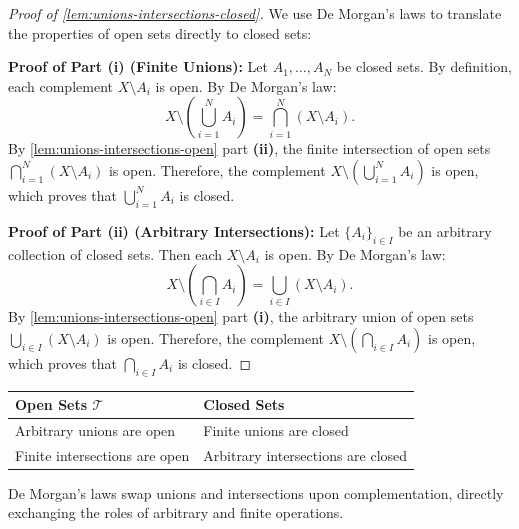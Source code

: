 \begin{content}
\begin{proof}[Proof of \cref{lem:unions-intersections-closed}]
We use De Morgan's laws to translate the properties of open sets directly to closed sets:

\textbf{Proof of Part (i) (Finite Unions):}
Let $A_1, \dots, A_N$ be closed sets. By definition, each complement $X \setminus A_i$ is open.
By De Morgan's law:
\begin{equation}\label{eq:demorgan-union}
X \setminus \left( \bigcup_{i=1}^N A_i \right) = \bigcap_{i=1}^N (X \setminus A_i).
\end{equation}
By \cref{lem:unions-intersections-open} part \textbf{(ii)}, the finite intersection of open sets $\bigcap_{i=1}^N (X \setminus A_i)$ is open.
Therefore, the complement $X \setminus \left( \bigcup_{i=1}^N A_i \right)$ is open, which proves that $\bigcup_{i=1}^N A_i$ is closed.

\textbf{Proof of Part (ii) (Arbitrary Intersections):}
Let $\{A_i\}_{i \in I}$ be an arbitrary collection of closed sets. Then each $X \setminus A_i$ is open.
By De Morgan's law:
\begin{equation}\label{eq:demorgan-intersection}
X \setminus \left( \bigcap_{i \in I} A_i \right) = \bigcup_{i \in I} (X \setminus A_i).
\end{equation}
By \cref{lem:unions-intersections-open} part \textbf{(i)}, the arbitrary union of open sets $\bigcup_{i \in I} (X \setminus A_i)$ is open.
Therefore, the complement $X \setminus \left( \bigcap_{i \in I} A_i \right)$ is open, which proves that $\bigcap_{i \in I} A_i$ is closed.
\end{proof}

\begin{steps}
\begin{center}
\begin{tabular}{l l}
    \textbf{Open Sets $\mathcal{T}$} & \textbf{Closed Sets} \\
    \hline
    Arbitrary unions are open & Finite unions are closed \\
    Finite intersections are open & Arbitrary intersections are closed \\
\end{tabular}
\end{center}
De Morgan's laws swap unions and intersections upon complementation, directly exchanging the roles of arbitrary and finite operations.
\end{steps}
\end{content}

